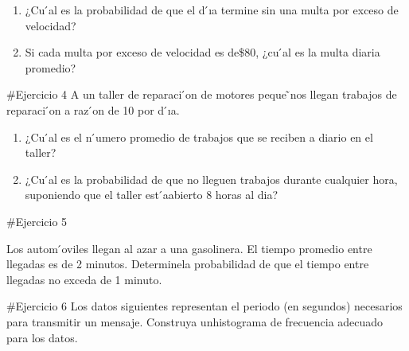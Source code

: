 \documentclass[
]{article}
\begin{document}
\begin{enumerate}
\def\labelenumi{\alph{enumi})}
\item
  ¿Cu ́al es la probabilidad de que el d ́ıa termine sin una multa por
  exceso de velocidad?
\item
  Si cada multa por exceso de velocidad es de\$80, ¿cu ́al es la multa
  diaria promedio?
\end{enumerate}

\#Ejercicio 4 A un taller de reparaci ́on de motores peque ̃nos llegan
trabajos de reparaci ́on a raz ́on de 10 por d ́ıa.

\begin{enumerate}
\def\labelenumi{\alph{enumi})}
\item
  ¿Cu ́al es el n ́umero promedio de trabajos que se reciben a diario en
  el taller?
\item
  ¿Cu ́al es la probabilidad de que no lleguen trabajos durante
  cualquier hora, suponiendo que el taller est ́aabierto 8 horas al dia?
\end{enumerate}

\#Ejercicio 5

Los autom ́oviles llegan al azar a una gasolinera. El tiempo promedio
entre llegadas es de 2 minutos. Determinela probabilidad de que el
tiempo entre llegadas no exceda de 1 minuto.

\#Ejercicio 6 Los datos siguientes representan el periodo (en segundos)
necesarios para transmitir un mensaje. Construya unhistograma de
frecuencia adecuado para los datos.
\end{document}
